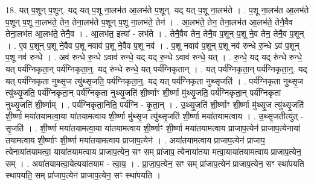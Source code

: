 \documentclass[17pt]{extarticle}
\begin{document}
18. यत् प॒शून् प॒शून्. यद् यत् प॒शू ना॒लभ॑त आ॒लभ॑ते प॒शून्. यद् यत् प॒शू ना॒लभ॑ते । . प॒शू ना॒लभ॑त आ॒लभ॑ते प॒शून् प॒शू ना॒लभ॑ते॒ तेन॒ तेना॒लभ॑ते प॒शून् प॒शू ना॒लभ॑ते॒ तेन॑ । . आ॒लभ॑ते॒ तेन॒ तेना॒लभ॑त आ॒लभ॑ते॒ तेनै॒वैव तेना॒लभ॑त आ॒लभ॑ते॒ तेनै॒व । . आ॒लभ॑त॒ इत्या᳚ - लभ॑ते । . तेनै॒वैव तेन॒ तेनै॒व प॒शून् प॒शू ने॒व तेन॒ तेनै॒व प॒शून् । . ए॒व प॒शून् प॒शू ने॒वैव प॒शू नवाव॑ प॒शू ने॒वैव प॒शू नव॑ । . प॒शू नवाव॑ प॒शून् प॒शू नव॑ रुन्धे रु॒न्धे ऽव॑ प॒शून् प॒शू नव॑ रुन्धे । . अव॑ रुन्धे रु॒न्धे ऽवाव॑ रुन्धे॒ यद् यद् रु॒न्धे ऽवाव॑ रुन्धे॒ यत् । . रु॒न्धे॒ यद् यद् रु॑न्धे रुन्धे॒ यत् पर्य॑ग्निकृता॒न् पर्य॑ग्निकृता॒न्॒. यद् रु॑न्धे रुन्धे॒ यत् पर्य॑ग्निकृतान् । . यत् पर्य॑ग्निकृता॒न् पर्य॑ग्निकृता॒न्॒. यद् यत् पर्य॑ग्निकृता नुथ्सृ॒ज त्यु॑थ्सृ॒जति॒ पर्य॑ग्निकृता॒न्॒. यद् यत् पर्य॑ग्निकृता नुथ्सृ॒जति॑ । . पर्य॑ग्निकृता नुथ्सृ॒ज त्यु॑थ्सृ॒जति॒ पर्य॑ग्निकृता॒न् पर्य॑ग्निकृता नुथ्सृ॒जति॑ शी॒र्ष्णाꣳ शी॒र्ष्णा मु॑थ्सृ॒जति॒ पर्य॑ग्निकृता॒न् पर्य॑ग्निकृता नुथ्सृ॒जति॑ शी॒र्ष्णाम् । . पर्य॑ग्निकृता॒निति॒ पर्य॑ग्नि - कृ॒ता॒न् । . उ॒थ्सृ॒जति॑ शी॒र्ष्णाꣳ शी॒र्ष्णा मु॑थ्सृ॒ज त्यु॑थ्सृ॒जति॑ शी॒र्ष्णा मया॑तयामत्वा॒या या॑तयामत्वाय शी॒र्ष्णा मु॑थ्सृ॒ज त्यु॑थ्सृ॒जति॑ शी॒र्ष्णा मया॑तयामत्वाय । . उ॒थ्सृ॒जतीत्यु॑त् - सृ॒जति॑ । . शी॒र्ष्णा मया॑तयामत्वा॒या या॑तयामत्वाय शी॒र्ष्णाꣳ शी॒र्ष्णा मया॑तयामत्वाय प्राजाप॒त्येन॑ प्राजाप॒त्येनाया॑ तयामत्वाय शी॒र्ष्णाꣳ शी॒र्ष्णा मया॑तयामत्वाय प्राजाप॒त्येन॑ । . अया॑तयामत्वाय प्राजाप॒त्येन॑ प्राजाप॒ त्येनाया॑तयामत्वा॒ याया॑तयामत्वाय प्राजाप॒त्येन॒ सꣳ सम् प्रा॑जाप॒ त्येनाया॑तया मत्वा॒याया॑तयामत्वाय प्राजाप॒त्येन॒ सम् । . अया॑तयामत्वा॒येत्यया॑तयाम - त्वा॒य॒ । . प्रा॒जा॒प॒त्येन॒ सꣳ सम् प्रा॑जाप॒त्येन॑ प्राजाप॒त्येन॒ सꣳ स्था॑पयति स्थापयति॒ सम् प्रा॑जाप॒त्येन॑ प्राजाप॒त्येन॒ सꣳ स्था॑पयति । \newline
\end{document}
